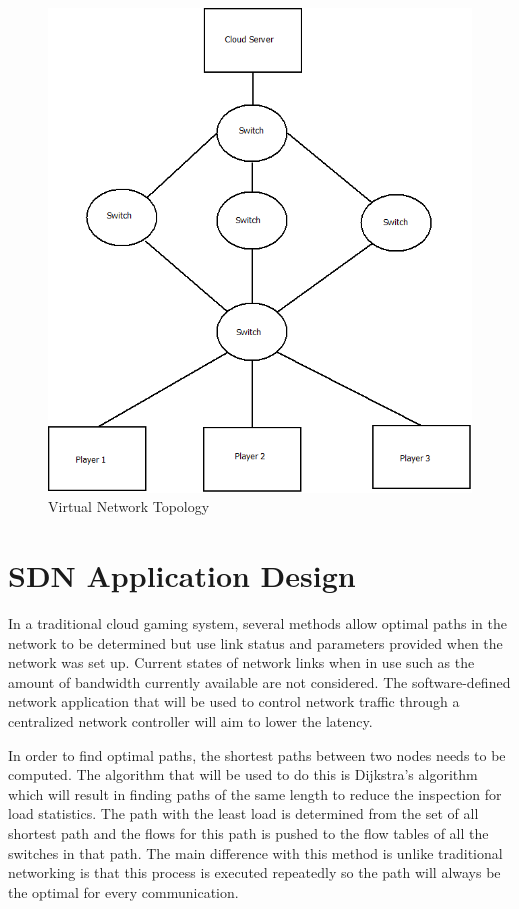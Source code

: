 \begin{figure}[h!]
 \centering
 \includegraphics[width=\linewidth]{images/network.png}
 \caption{Virtual Network Topology}
 \label{fig:network}
\end{figure}

\section{SDN Application Design}
In a traditional cloud gaming system, several methods allow optimal paths in the network to be determined but use link status and parameters provided when the network was set up. Current states of network links when in use such as the amount of bandwidth currently available are not considered. The software-defined network application that will be used to control network traffic through a centralized network controller will aim to lower the latency.
\newline
\par
In order to find optimal paths, the shortest paths between two nodes needs to be computed. The algorithm that will be used to do this is Dijkstra's algorithm which will result in finding paths of the same length to reduce the inspection for load statistics. The path with the least load is determined from the set of all shortest path and the flows for this path is pushed to the flow tables of all the switches in that path. The main difference with this method is unlike traditional networking is that this process is executed repeatedly so the path will always be the optimal for every communication.
